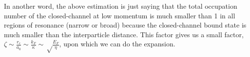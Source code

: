  



 In another word, the above estimation is just saying that the total occupation number of the closed-channel at low momentum is much smaller than 1 in all regions of resonance (narrow or broad) because the closed-channel bound state is much smaller than the interparticle distance.  This factor gives us a small factor, $\zeta\sim\frac{r_{c}}{a_{0}}\sim\frac{k_{F}}{\kappa}\sim\sqrt\frac{E_{F}}{\eta}$, upon which we can do the expansion.  
